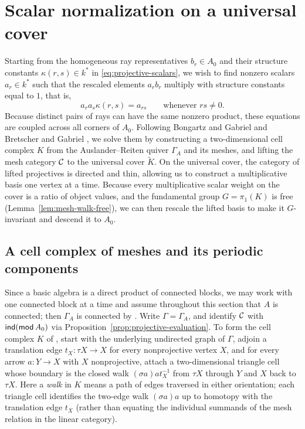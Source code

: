 \section{Scalar normalization on a universal cover}
\label{sec:scalar-normalization}

Starting from the homogeneous ray representatives $b_r\in A_0$ and their
structure constants $\kappa(r,s)\in k^*$ in \eqref{eq:projective-scalars}, we
wish to find nonzero scalars $a_r\in k^*$ such that the rescaled elements
$a_r b_r$ multiply with structure constants equal to $1$, that is,
\[
                   a_ra_s\kappa(r,s)=a_{rs}\qquad\text{whenever }rs\ne0.
\]
Because distinct pairs of rays can have the same nonzero product, these
equations are coupled across all corners of $A_0$. Following Bongartz and
Gabriel \cite[Section~4]{BongartzGabriel} and Bretscher and Gabriel
\cite[Sections~2.6 and~3.1--3.2]{BretscherGabriel}, we solve them by
constructing a two-dimensional cell complex $K$ from the Auslander--Reiten
quiver $\Gamma_A$ and its meshes, and lifting the mesh category $\mathcal C$ to the
universal cover $\widetilde K$. On the universal cover, the category of
lifted projectives is directed and thin, allowing us to construct a
multiplicative basis one vertex at a time. Because every multiplicative
scalar weight on the cover is a ratio of object values, and the fundamental
group $G=\pi_1(K)$ is free (Lemma~\ref{lem:mesh-walk-free}), we can then
rescale the lifted basis to make it $G$-invariant and descend it to $A_0$.

\subsection{A cell complex of meshes and its periodic components}
\label{subsec:mesh-walk-cover}

Since a basic algebra is a direct product of connected blocks, we may work
with one connected block at a time and assume throughout this section that
$A$ is connected; then $\Gamma_A$ is connected by
\cite[Theorem~VII.2.1]{ARS}. Write $\Gamma=\Gamma_A$, and identify $\mathcal C$ with
$\operatorname{\mathsf{ind}}(\operatorname{\mathsf{mod}} A_0)$ via Proposition~\ref{prop:projective-evaluation}. To form
the cell complex $K$ of \cite[Section~4.1]{BongartzGabriel}, start with the
underlying undirected graph of $\Gamma$, adjoin a translation edge
$t_X:\tau X\to X$ for every nonprojective vertex $X$, and for every arrow
$a:Y\to X$ with $X$ nonprojective, attach a two-dimensional triangle cell
whose boundary is the closed walk $(\sigma a)a t_X^{-1}$ from $\tau X$
through $Y$ and $X$ back to $\tau X$. Here a \emph{walk} in $K$ means a path
of edges traversed in either orientation; each triangle cell identifies the
two-edge walk $(\sigma a)a$ up to homotopy with the translation edge $t_X$
(rather than equating the individual summands of the mesh relation in the
linear category).


